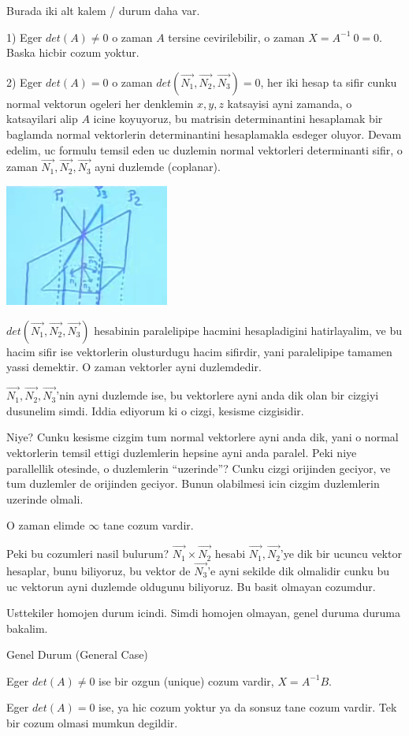 \documentclass[12pt,fleqn]{article}
\begin{document}
Burada iki alt kalem / durum daha var. 

1) Eger $det(A) \ne 0$ o zaman $A$ tersine cevirilebilir, o zaman $X =
A^{-1} \ 0 = 0$. 
Baska hicbir cozum yoktur.

2) Eger $det(A) = 0$ o zaman $det(\vec{N_1},\vec{N_2},\vec{N_3}) = 0$, her
iki hesap ta sifir cunku normal vektorun ogeleri her denklemin $x,y,z$
katsayisi ayni zamanda, o katsayilari alip $A$ icine koyuyoruz, bu matrisin
determinantini hesaplamak bir baglamda normal vektorlerin determinantini
hesaplamakla esdeger oluyor. Devam edelim, uc formulu temsil eden uc
duzlemin normal vektorleri determinanti sifir, o zaman 
$\vec{N_1},\vec{N_2},\vec{N_3}$ ayni duzlemde (coplanar).

\includegraphics[height=4cm]{4_5.png}

$det(\vec{N_1},\vec{N_2},\vec{N_3})$ hesabinin paralelipipe hacmini hesapladigini hatirlayalim, ve 
bu hacim sifir ise vektorlerin olusturdugu hacim sifirdir, yani paralelipipe 
tamamen yassi demektir. O zaman vektorler ayni duzlemdedir. 

$\vec{N_1},\vec{N_2},\vec{N_3}$'nin ayni duzlemde ise, bu vektorlere ayni
anda dik olan bir cizgiyi dusunelim simdi. Iddia ediyorum ki o cizgi,
kesisme cizgisidir.

Niye? Cunku kesisme cizgim tum normal vektorlere ayni anda dik, yani o
normal vektorlerin temsil ettigi duzlemlerin hepsine ayni anda
paralel. Peki niye parallellik otesinde, o duzlemlerin ``uzerinde''? Cunku
cizgi orijinden geciyor, ve tum duzlemler de orijinden geciyor. Bunun
olabilmesi icin cizgim duzlemlerin uzerinde olmali.

O zaman elimde $\infty$ tane cozum vardir. 

Peki bu cozumleri nasil bulurum? $\vec{N_1} \times \vec{N_2}$ hesabi
$\vec{N_1},\vec{N_2}$'ye dik bir ucuncu vektor hesaplar, bunu biliyoruz, bu
vektor de $\vec{N_3}$'e ayni sekilde dik olmalidir cunku bu uc vektorun
ayni duzlemde oldugunu biliyoruz. Bu basit olmayan cozumdur.

Usttekiler homojen durum icindi. Simdi homojen olmayan, genel duruma duruma
bakalim.

Genel Durum (General Case)

Eger $det(A) \ne 0$ ise bir ozgun (unique) cozum vardir, $X = A^{-1}B$. 

Eger $det(A) = 0$ ise, ya hic cozum yoktur ya da sonsuz tane cozum
vardir. Tek bir cozum olmasi mumkun degildir. 
\end{document}
